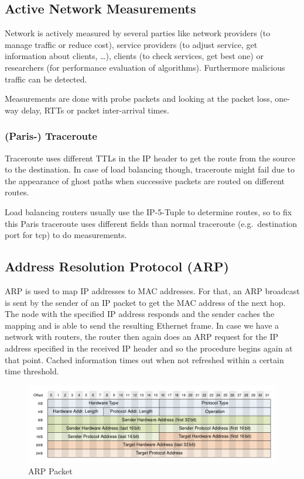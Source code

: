 \subsection{Active Network Measurements}
Network is actively measured by several parties like network providers (to manage traffic or reduce cost), service providers (to adjust service, get information about clients, \dots), clients (to check services, get best one) or researchers (for performance evaluation of algorithms).
Furthermore malicious traffic can be detected.
\vspace{5pt}

Measurements are done with probe packets and looking at the packet loss, one-way delay, RTTs or packet inter-arrival times.

\subsubsection*{(Paris-) Traceroute}
Traceroute uses different TTLs in the IP header to get the route from the source to the destination.
In case of load balancing though, traceroute might fail due to the appearance of ghost paths when successive packets are routed on different routes.

Load balancing routers usually use the IP-5-Tuple to determine routes, so to fix this Paris traceroute uses different fields than normal traceroute (e.g.\ destination port for tcp) to do measurements.

\subsection{Address Resolution Protocol (ARP)}
ARP is used to map IP addresses to MAC addresses.
For that, an ARP broadcast is sent by the sender of an IP packet to get the MAC address of the next hop.
The node with the specified IP address responds and the sender caches the mapping and is able to send the resulting Ethernet frame.
In case we have a network with routers, the router then again does an ARP request for the IP address specified in the received IP header and so the procedure begins again at that point.
Cached information times out when not refreshed within a certain time threshold.
\begin{figure}[H]
  \centering
  \includegraphics[width=.8\textwidth]{figures/arp_packet.png}
  \caption{ARP Packet}\label{fig:arp_packet}
\end{figure}

